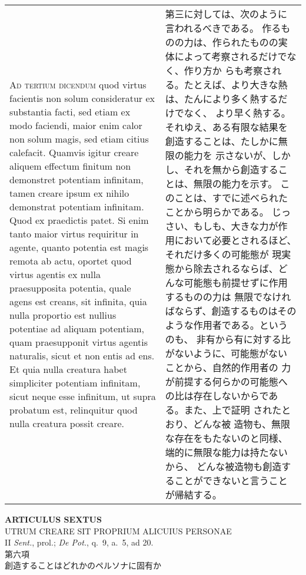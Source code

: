 \documentclass[10pt]{jsarticle} %
\begin{document}
\begin{longtable}{p{21em}p{21em}}
\\


{\scshape Ad tertium dicendum} quod virtus facientis non
 solum consideratur ex substantia facti, sed etiam ex modo faciendi,
 maior enim calor non solum magis, sed etiam citius calefacit. Quamvis
 igitur creare aliquem effectum finitum non demonstret potentiam
 infinitam, tamen creare ipsum ex nihilo demonstrat potentiam
 infinitam. Quod ex praedictis patet. Si enim tanto maior virtus
 requiritur in agente, quanto potentia est magis remota ab actu, oportet
 quod virtus agentis ex nulla praesupposita potentia, quale agens est
 creans, sit infinita, quia nulla proportio est nullius potentiae ad
 aliquam potentiam, quam praesupponit virtus agentis naturalis, sicut et
 non entis ad ens. Et quia nulla creatura habet simpliciter potentiam
 infinitam, sicut neque esse infinitum, ut supra probatum est,
 relinquitur quod nulla creatura possit creare.


&
第三に対しては、次のように言われるべきである。
作るものの力は、作られたものの実体によって考察されるだけでなく、作り方か
 らも考察される。たとえば、より大きな熱は、たんにより多く熱するだけでなく、
 より早く熱する。それゆえ、ある有限な結果を創造することは、たしかに無限の能力を
 示さないが、しかし、それを無から創造することは、無限の能力を示す。
このことは、すでに述べられたことから明らかである。
じっさい、もしも、大きな力が作用において必要とされるほど、それだけ多くの可能態が
 現実態から除去されるならば、どんな可能態も前提せずに作用するものの力は
 無限でなければならず、創造するものはそのような作用者である。というのも、
 非有から有に対する比がないように、可能態がないことから、自然的作用者の
 力が前提する何らかの可能態への比は存在しないからである。また、上で証明
 されたとおり、どんな被
 造物も、無限な存在をもたないのと同様、端的に無限な能力は持たないから、
 どんな被造物も創造することができないと言うことが帰結する。


\end{longtable}
\newpage
{}
\begin{center}
 {\Large {\bf ARTICULUS SEXTUS}}\\
 {\large UTRUM CREARE SIT PROPRIUM ALICUIUS PERSONAE}\\
 {\footnotesize II {\itshape Sent.}, prol.; {\itshape De Pot.}, q.~9,
 a.~5, ad 20.}\\
 {\Large 第六項\\創造することはどれかのペルソナに固有か}
\end{center}
\end{document}
